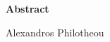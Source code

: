 {\selectfont

\begin{center}



\centering
\textbf{Abstract}
\end{center}



\begin{flushright}
Alexandros Philotheou
\end{flushright}

}
